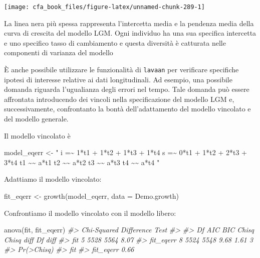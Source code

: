 \documentclass[
  11pt,
]{krantz}
\makeatletter
\newenvironment{Shaded}{\begin{snugshade}}{\end{snugshade}}
\newcommand{\AttributeTok}[1]{\textcolor[rgb]{0.61,0.61,0.61}{#1}}
\newcommand{\CommentTok}[1]{\textcolor[rgb]{0.37,0.37,0.37}{\textit{#1}}}
\newcommand{\FunctionTok}[1]{\textcolor[rgb]{0,0,0}{#1}}
\newcommand{\NormalTok}[1]{#1}
\newcommand{\OtherTok}[1]{\textcolor[rgb]{0.37,0.37,0.37}{#1}}
\newcommand{\StringTok}[1]{\textcolor[rgb]{0.5,0.5,0.5}{#1}}
\newenvironment{kframe}{%
\medskip{}
\setlength{\fboxsep}{.8em}
 \def\at@end@of@kframe{}%
 \ifinner\ifhmode%
  \def\at@end@of@kframe{\end{minipage}}%
  \begin{minipage}{\columnwidth}%
 \fi\fi%
 \def\FrameCommand##1{\hskip\@totalleftmargin \hskip-\fboxsep
 \colorbox{shadecolor}{##1}\hskip-\fboxsep
     \hskip-\linewidth \hskip-\@totalleftmargin \hskip\columnwidth}%
 \MakeFramed {\advance\hsize-\width
   \@totalleftmargin\z@ \linewidth\hsize
   \@setminipage}}%
 {\par\unskip\endMakeFramed%
 \at@end@of@kframe}
\renewenvironment{Shaded}{\begin{kframe}}{\end{kframe}}
\theoremstyle{definition}
\theoremstyle{definition}
\theoremstyle{definition}
\theoremstyle{definition}
\theoremstyle{remark}
\makeatother
\begin{document}
\begin{center}\texttt{[image: cfa\_book\_files/figure-latex/unnamed-chunk-289-1]} \end{center}

La linea nera più spessa rappresenta l'intercetta media e la pendenza media della curva di crescita del modello LGM. Ogni individuo ha una sua specifica intercetta e uno specifico tasso di cambiamento e questa diversità è catturata nelle componenti di varianza del modello

È anche possibile utilizzare le funzionalità di \texttt{lavaan} per verificare specifiche ipotesi di interesse relative ai dati longitudinali. Ad esempio, una possibile domanda riguarda l'ugualianza degli errori nel tempo. Tale domanda può essere affrontata introducendo dei vincoli nella specificazione del modello LGM e, successivamente, confrontanto la bontà dell'adattamento del modello vincolato e del modello generale.

Il modello vincolato è

\begin{Shaded}
\begin{Highlighting}[]
\NormalTok{model\_eqerr }\OtherTok{\textless{}{-}} \StringTok{"}
\StringTok{ i =\textasciitilde{} 1*t1 + 1*t2 + 1*t3 + 1*t4}
\StringTok{ s =\textasciitilde{} 0*t1 + 1*t2 + 2*t3 + 3*t4}
\StringTok{ t1 \textasciitilde{}\textasciitilde{} a*t1}
\StringTok{ t2 \textasciitilde{}\textasciitilde{} a*t2}
\StringTok{ t3 \textasciitilde{}\textasciitilde{} a*t3}
\StringTok{ t4 \textasciitilde{}\textasciitilde{} a*t4}
\StringTok{"}
\end{Highlighting}
\end{Shaded}

Adattiamo il modello vincolato:

\begin{Shaded}
\begin{Highlighting}[]
\NormalTok{fit\_eqerr }\OtherTok{\textless{}{-}} \FunctionTok{growth}\NormalTok{(model\_eqerr, }\AttributeTok{data =}\NormalTok{ Demo.growth)}
\end{Highlighting}
\end{Shaded}

Confrontiamo il modello vincolato con il modello libero:

\begin{Shaded}
\begin{Highlighting}[]
\FunctionTok{anova}\NormalTok{(fit, fit\_eqerr)}
\CommentTok{\#\textgreater{} Chi{-}Squared Difference Test}
\CommentTok{\#\textgreater{} }
\CommentTok{\#\textgreater{}           Df  AIC  BIC Chisq Chisq diff Df diff}
\CommentTok{\#\textgreater{} fit        5 5528 5564  8.07                   }
\CommentTok{\#\textgreater{} fit\_eqerr  8 5524 5548  9.68       1.61       3}
\CommentTok{\#\textgreater{}           Pr(\textgreater{}Chisq)}
\CommentTok{\#\textgreater{} fit                 }
\CommentTok{\#\textgreater{} fit\_eqerr       0.66}
\end{Highlighting}
\end{Shaded}
\end{document}
